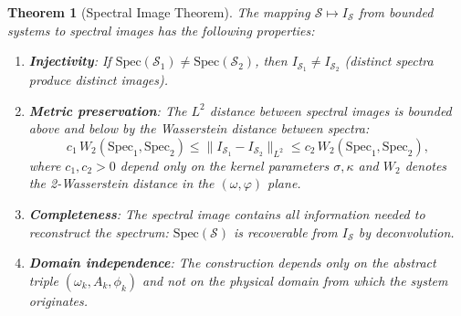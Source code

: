 \documentclass[11pt,twocolumn,a4paper]{article}
\newtheorem{theorem}{Theorem}[section]
\newcommand{\Spec}{\mathrm{Spec}}
\begin{document}
\begin{theorem}[Spectral Image Theorem]
\label{thm:spectral_image}
The mapping $\mathcal{S} \mapsto I_{\mathcal{S}}$ from bounded systems
to spectral images has the following properties:
\begin{enumerate}[label=(\roman*),nosep]
  \item \textbf{Injectivity}: If
    $\Spec(\mathcal{S}_1) \neq \Spec(\mathcal{S}_2)$, then
    $I_{\mathcal{S}_1} \neq I_{\mathcal{S}_2}$ (distinct spectra
    produce distinct images).
  \item \textbf{Metric preservation}: The $L^2$ distance between
    spectral images is bounded above and below by the Wasserstein
    distance between spectra:
    \begin{equation}
    \label{eq:metric_preservation}
      c_1 \, W_2(\Spec_1, \Spec_2) \leq
      \|I_{\mathcal{S}_1} - I_{\mathcal{S}_2}\|_{L^2} \leq
      c_2 \, W_2(\Spec_1, \Spec_2),
    \end{equation}
    where $c_1, c_2 > 0$ depend only on the kernel parameters
    $\sigma, \kappa$ and $W_2$ denotes the 2-Wasserstein distance
    in the $(\omega, \varphi)$ plane.
  \item \textbf{Completeness}: The spectral image contains all
    information needed to reconstruct the spectrum:
    $\Spec(\mathcal{S})$ is recoverable from $I_{\mathcal{S}}$
    by deconvolution.
  \item \textbf{Domain independence}: The construction depends only on
    the abstract triple $(\omega_k, A_k, \phi_k)$ and not on the
    physical domain from which the system originates.
\end{enumerate}
\end{theorem}
\end{document}
